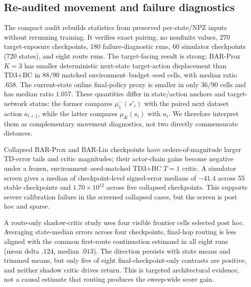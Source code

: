 \subsection{Re-audited movement and failure diagnostics}

The compact audit rebuilds statistics from preserved per-state/NPZ inputs without rerunning training. It verifies exact pairing, no nonfinite values, 270 target-exposure checkpoints, 180 failure-diagnostic runs, 60 simulator checkpoints (720 states), and eight route runs. The target-facing result is strong: BAR-Prox $K=3$ has smaller deterministic next-state target-action displacement than TD3+BC in $88/90$ matched environment--budget--seed cells, with median ratio $.658$. The current-state online final-policy proxy is smaller in only $36/90$ cells and has median ratio $1.057$. These quantities differ in state/action anchors and target-network status: the former compares $\mu_1^-(s'_i)$ with the paired next dataset action $a_{i+1}$, while the latter compares $\mu_K(s_i)$ with $a_i$. We therefore interpret them as complementary movement diagnostics, not two directly commensurate distances.

Collapsed BAR-Prox and BAR-Lin checkpoints have orders-of-magnitude larger TD-error tails and critic magnitudes; their actor-chain gains become negative under a frozen, environment--seed-matched TD3+BC $T=1$ critic. A simulator screen gives a median of checkpoint-level signed-error medians of $-41.4$ across 55 stable checkpoints and $1.70\times10^{12}$ across five collapsed checkpoints. This supports severe calibration failure in the screened collapsed cases, but the screen is post hoc and sparse.

A route-only shadow-critic study uses four visible frontier cells selected post hoc. Averaging state-median errors across four checkpoints, final-hop routing is less aligned with the common first-route continuation estimand in all eight runs (mean delta $.124$, median $.013$). The direction persists with state means and trimmed means, but only five of eight final-checkpoint-only contrasts are positive, and neither shadow critic drives return. This is targeted architectural evidence, not a causal estimate that routing produces the sweep-wide score gain.
